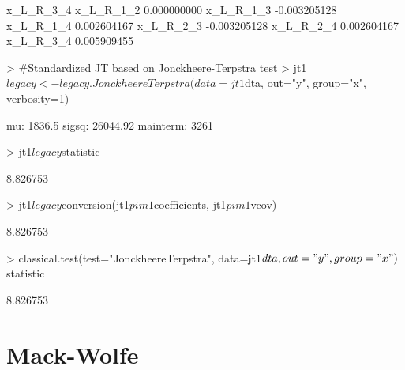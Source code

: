 \documentclass[12pt]{article}
\begin{document}
\begin{Schunk}
\begin{Soutput}
             x_L_R_3_4
x_L_R_1_2  0.000000000
x_L_R_1_3 -0.003205128
x_L_R_1_4  0.002604167
x_L_R_2_3 -0.003205128
x_L_R_2_4  0.002604167
x_L_R_3_4  0.005909455
\end{Soutput}
\begin{Sinput}
> 	#Standardized JT based on Jonckheere-Terpstra test
> 	jt1$legacy<-legacy.JonckheereTerpstra(data=jt1$dta, out="y", group="x", verbosity=1) 
\end{Sinput}
\begin{Soutput}
mu: 1836.5 
sigsq: 26044.92 
mainterm: 3261 
\end{Soutput}
\begin{Sinput}
> 	jt1$legacy$statistic
\end{Sinput}
\begin{Soutput}
[1] 8.826753
\end{Soutput}
\begin{Sinput}
> 	jt1$legacy$conversion(jt1$pim1$coefficients, jt1$pim1$vcov)
\end{Sinput}
\begin{Soutput}
         [,1]
[1,] 8.826753
\end{Soutput}
\begin{Sinput}
> 	classical.test(test="JonckheereTerpstra", data=jt1$dta, out="y", group="x")$statistic
\end{Sinput}
\begin{Soutput}
         [,1]
[1,] 8.826753
\end{Soutput}
\end{Schunk}

\section{Mack-Wolfe}\label{S_MW}
\end{document}

